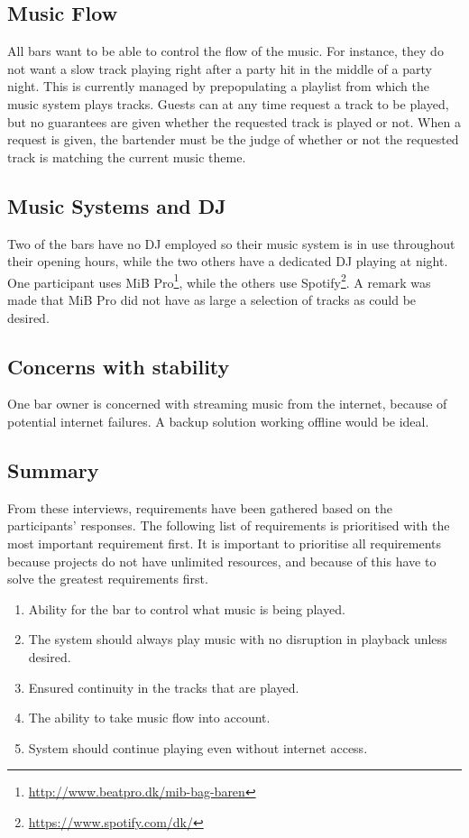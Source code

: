 \subsection{Music Flow}
\label{sub:MusicFlow}

All bars want to be able to control the flow of the music. For instance, they do not want a slow track playing right after a party hit in the middle of a party night. This is currently managed by prepopulating a playlist from which the music system plays tracks. Guests can at any time request a track to be played, but no guarantees are given whether the requested track is played or not. When a request is given, the bartender must be the judge of whether or not the requested track is matching the current music theme.

\subsection{Music Systems and DJ}
\label{sub:differences}
Two of the bars have no DJ employed so their music system is in use throughout their opening hours, while the two others have a dedicated DJ playing at night. One participant uses MiB Pro\footnote{\url{http://www.beatpro.dk/mib-bag-baren}}, while the others use Spotify\footnote{\url{https://www.spotify.com/dk/}}. A remark was made that MiB Pro did not have as large a selection of tracks as could be desired.

\subsection{Concerns with stability}
\label{sub:specific_remarks}

One bar owner is concerned with streaming music from the internet, because of potential internet failures. A backup solution working offline would be ideal.

\subsection{Summary}
\label{sub:summary}

From these interviews, requirements have been gathered based on the
participants' responses. The following list of requirements is
prioritised with the most important requirement first.  It is
important to prioritise all requirements because projects do not have
unlimited resources, and because of this have to solve the greatest
requirements first.

\begin{enumerate}
\item Ability for the bar to control what music is being
    played.
\item The system should always play music with no disruption in playback unless desired.
\item Ensured continuity in the tracks that are played.
\item The ability to take music flow into account.
\item System should continue playing even without internet access.
\end{enumerate}
